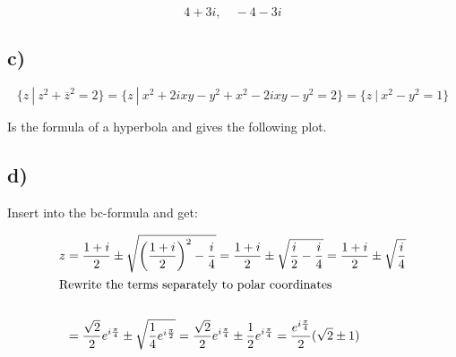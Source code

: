 \documentclass{article}
\begin{document}
\[4 + 3i, \quad -4 -3i\]




\subsection*{c)}
\[\{z~|~ z^2 + \overline{z}^2 = 2\} = \{z~ | ~ x^2 + 2ixy - y^2 + x^2 -2ixy -y^2 = 2\} = \{z ~| ~ x^2 -y^2 = 1\}\]

Is the formula of a hyperbola and gives the following plot.\\

\tikzset{>=stealth}
\begin{center}
\end{center}





\subsection*{d)}



Insert into the bc-formula and get:

\begin{align*}
  z &= \frac{1 +i}{2} \pm \sqrt{\left(\frac{1 + i}{2}\right)^2 - \frac{i}{4}} = \frac{1 +i}{2} \pm \sqrt{\frac{i}{2} - \frac{i}{4}} = \frac{1 +i}{2} \pm \sqrt{\frac{i}{4}}
  \\
  \intertext{Rewrite the terms separately to polar coordinates}\\
  &= \frac{\sqrt{2}}{2}e^{i\frac{\pi}{4}} \pm \sqrt{\frac{1}{4}e^{i\frac{\pi}{2}}} = \frac{\sqrt{2}}{2}e^{i\frac{\pi}{4}} \pm \frac{1}{2}e^{i\frac{\pi}{4}}  = \frac{e^{i\frac{\pi}{4}}}{2}(\sqrt{2} \pm 1)\\
\end{align*}
\end{document}
